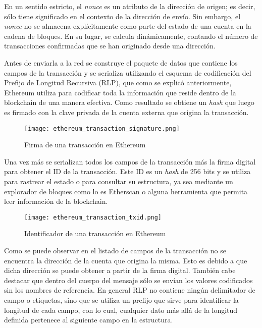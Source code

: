 En un sentido estricto, el \textit{nonce} es un atributo de la dirección de origen; es decir, sólo tiene significado en el contexto de la dirección de envío. Sin embargo, el \textit{nonce} no se almacena explícitamente como parte del estado de una cuenta en la cadena de bloques. En su lugar, se calcula dinámicamente, contando el número de transacciones confirmadas que se han originado desde una dirección.

Antes de enviarla a la red se construye el paquete de datos que contiene los campos de la transacción y se serializa utilizando el esquema de codificación del Prefijo de Longitud Recursiva (RLP), que como se explicó anteriormente, Ethereum utiliza para codificar toda la información que reside dentro de la blockchain de una manera efectiva. Como resultado se obtiene un \textit{hash} que luego es firmado con la clave privada de la cuenta externa que origina la transacción.

\begin{figure}[H]
  \texttt{[image: ethereum\_transaction\_signature.png]}
  \centering
  \caption{Firma de una transacción en Ethereum}
  \label{fig:merkle-ptricia-trie}
\end{figure}

Una vez más se serializan todos los campos de la transacción más la firma digital para obtener el ID de la transacción. Este ID es un \textit{hash} de 256 bits y se utiliza para rastrear el estado o para consultar su estructura, ya sea mediante un explorador de bloques como lo es Etherscan\cite{Etherscan2018} o alguna herramienta que permita leer información de la blockchain.

\begin{figure}[H]
  \texttt{[image: ethereum\_transaction\_txid.png]}
  \centering
  \caption{Identificador de una transacción en Ethereum}
  \label{fig:merkle-ptricia-trie}
\end{figure}

Como se puede observar en el listado de campos de la transacción no se encuentra la dirección de la cuenta que origina la misma. Esto es debido a que dicha dirección se puede obtener a partir de la firma digital. También cabe destacar que dentro del cuerpo del mensaje sólo se envían los valores codificados sin los nombres de referencia. En general RLP no contiene ningún delimitador de campo o etiquetas, sino que se utiliza un prefijo que sirve para identificar la longitud de cada campo, con lo cual, cualquier dato más allá de la longitud definida pertenece al siguiente campo en la estructura.

